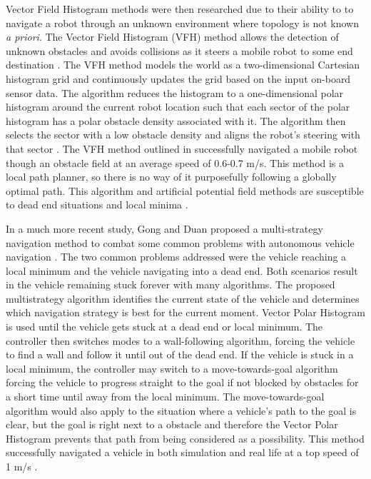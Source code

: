 \documentclass[12pt,onecolumn]{report}
\begin{document}
Vector Field Histogram methods were then researched due to their ability to to navigate a robot through an unknown environment where topology is not known \textit{a priori}. The Vector Field Histogram (VFH) method allows the detection of unknown obstacles and avoids collisions as it steers a mobile robot to some end destination \cite{Borenstein&Koren1991}. The VFH method models the world as a two-dimensional Cartesian histogram grid and continuously updates the grid based on the input on-board sensor data. The algorithm reduces the histogram to a one-dimensional polar histogram around the current robot location such that each sector of the polar histogram has a polar obstacle density associated with it. The algorithm then selects the sector with a low obstacle density and aligns the robot's steering with that sector \cite{Borenstein&Koren1991}. The VFH method outlined in \cite{Borenstein&Koren1991} successfully navigated a mobile robot though an obstacle field at an average speed of 0.6-0.7 m/s. This method is a local path planner, so there is no way of it purposefully following a globally optimal path. This algorithm and artificial potential field methods are susceptible to dead end situations and local minima \cite{Borenstein&Koren1991}.

In a much more recent study, Gong and Duan proposed a multi-strategy navigation method to combat some common problems with autonomous vehicle navigation \cite{Gong&Duan2009}. The two common problems addressed were the vehicle reaching a local minimum and the vehicle navigating into a dead end. Both scenarios result in the vehicle remaining stuck forever with many algorithms. The proposed multistrategy algorithm identifies the current state of the vehicle and determines which navigation strategy is best for the current moment. Vector Polar Histogram is used until the vehicle gets stuck at a dead end or local minimum. The controller then switches modes to a wall-following algorithm, forcing the vehicle to find a wall and follow it until out of the dead end. If the vehicle is stuck in a local minimum, the controller may switch to a move-towards-goal algorithm forcing the vehicle to progress straight to the goal if not blocked by obstacles for a short time until away from the local minimum. The move-towards-goal algorithm would also apply to the situation where a vehicle's path to the goal is clear, but the goal is right next to a obstacle and therefore the Vector Polar Histogram prevents that path from being considered as a possibility. This method successfully navigated a vehicle in both simulation and real life at a top speed of 1 m/s \cite{Gong&Duan2009}.
\end{document}
